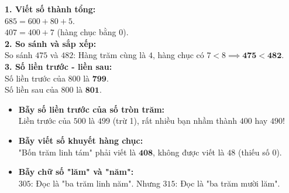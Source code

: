 \documentclass[12pt,a4paper]{article}
\begin{document}
\vspace{-2.5mm}
\noindent
\begin{minipage}[t]{0.49\textwidth}\vspace{0pt}
\begin{tcolorbox}[
  enhanced,
  colback=green!4!white,
  colframe=green!60!black,
  arc=2mm, boxrule=0.8pt,
  left=2mm, right=2mm, top=1.8mm, bottom=1.8mm,
  title={\footnotesize\bfseries\color{white}\faCheckCircle\ Ví dụ thực hành chuẩn mực}
]
{\footnotesize
\textbf{1. Viết số thành tổng:}\\
$685 = 600 + 80 + 5$.\\
$407 = 400 + 7$ (hàng chục bằng $0$).\\
\textbf{2. So sánh và sắp xếp:}\\
So sánh $475$ và $482$: Hàng trăm cùng là $4$, hàng chục có $7 < 8 \implies \mathbf{475 < 482}$.\\
\textbf{3. Số liền trước - liền sau:}\\
Số liền trước của $800$ là $\mathbf{799}$.\\
Số liền sau của $800$ là $\mathbf{801}$.
}
\end{tcolorbox}
\end{minipage}
\hfill
\begin{minipage}[t]{0.49\textwidth}\vspace{0pt}
\begin{tcolorbox}[
  enhanced,
  colback=red!4!white,
  colframe=red!70!black,
  arc=2mm, boxrule=0.8pt,
  left=2mm, right=2mm, top=1.8mm, bottom=1.8mm,
  title={\footnotesize\bfseries\color{white}\faExclamationTriangle\ Mẹo tránh bẫy trắc nghiệm}
]
{\footnotesize
\begin{itemize}\setlength{\itemsep}{1.5pt}\setlength{\leftskip}{-2.5mm}
  \item \textbf{Bẫy số liền trước của số tròn trăm:}\\
  Liền trước của $500$ là $499$ (trừ 1), rất nhiều bạn nhầm thành $400$ hay $490$!
  \item \textbf{Bẫy viết số khuyết hàng chục:}\\
  "Bốn trăm linh tám" phải viết là $\mathbf{408}$, không được viết là $48$ (thiếu số $0$).
  \item \textbf{Bẫy chữ số "lăm" và "năm":}\\
  $305$: Đọc là "ba trăm linh năm". Nhưng $315$: Đọc là "ba trăm mười lăm".
\end{itemize}
}
\end{tcolorbox}
\end{minipage}
\end{document}
